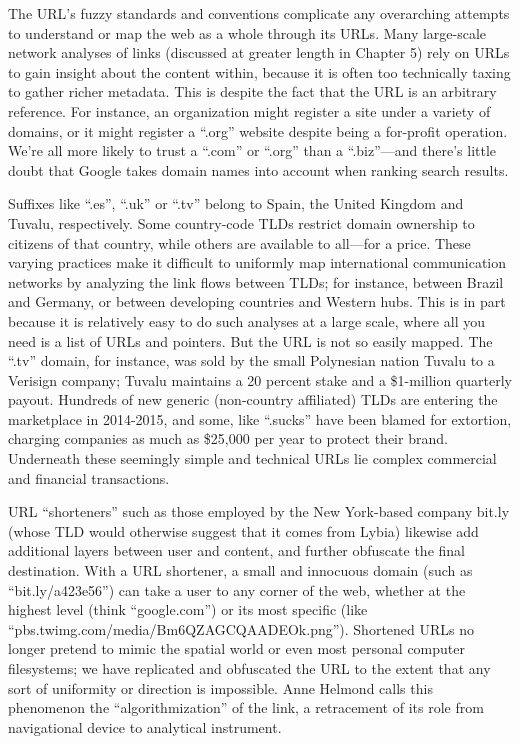 The URL's fuzzy standards and conventions complicate any overarching attempts to understand or map the web as a whole through its URLs. Many large-scale network analyses of links (discussed at greater length in Chapter 5) rely on URLs to gain insight about the content within, because it is often too technically taxing to gather richer metadata. This is despite the fact that the URL is an arbitrary reference. For instance, an organization might register a site under a variety of domains, or it might register a ``.org'' website despite being a for-profit operation. We're all more likely to trust a ``.com'' or ``.org'' than a ``.biz''---and there's little doubt that Google takes domain names into account when ranking search results.\autocite[See][]{liversidge_whats_2012}

Suffixes like ``.es'', ``.uk'' or ``.tv'' belong to Spain, the United Kingdom and Tuvalu, respectively. Some country-code TLDs restrict domain ownership to citizens of that country, while others are available to all---for a price. These varying practices make it difficult to uniformly map international communication networks by analyzing the link flows between TLDs; for instance, between Brazil and Germany, or between developing countries and Western hubs.\autocites[See, e.g.,][]{chung_inferring_2013}{fragoso_understanding_2011}{himelboim_international_2010} This is in part because it is relatively easy to do such analyses at a large scale, where all you need is a list of URLs and pointers. But the URL is not so easily mapped. The ``.tv'' domain, for instance, was sold by the small Polynesian nation Tuvalu to a Verisign company; Tuvalu maintains a 20 percent stake and a \$1-million quarterly payout.\autocite{cave_i_2000} Hundreds of new generic (non-country affiliated) TLDs are entering the marketplace in 2014-2015, and some, like ``.sucks'' have been blamed for extortion, charging companies as much as \$25,000 per year to protect their brand.\autocite{noguchi_new_2015} Underneath these seemingly simple and technical URLs lie complex commercial and financial transactions.

URL ``shorteners'' such as those employed by the New York-based company bit.ly (whose TLD would otherwise suggest that it comes from Lybia) likewise add additional layers between user and content, and further obfuscate the final destination. With a URL shortener, a small and innocuous domain (such as ``bit.ly/a423e56'') can take a user to any corner of the web, whether at the highest level (think ``google.com'') or its most specific (like ``pbs.twimg.com/media/Bm6QZAGCQAADEOk.png''). Shortened URLs no longer pretend to mimic the spatial world or even most personal computer filesystems; we have replicated and obfuscated the URL to the extent that any sort of uniformity or direction is impossible. Anne Helmond calls this phenomenon the ``algorithmization'' of the link, a retracement of its role from navigational device to analytical instrument.\autocite{helmond_algorithmization_2013}

